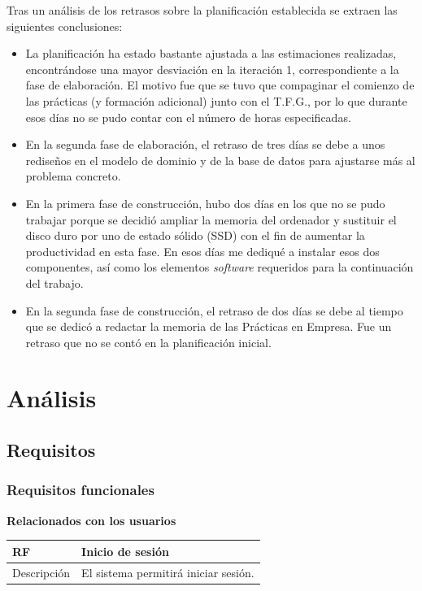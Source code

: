 \documentclass[twoside]{report}
\newcommand\addrow[2]{#1 &#2\\ }
\newcommand\addheading[2]{#1 &#2\\ \hline}
\newcommand\tabularhead{\begin{tabular}{lp{0.7\textwidth}}
\hline
}
\newenvironment{req}{\tabularhead}
{\hline\end{tabular}}
\begin{document}
Tras un análisis de los retrasos sobre la planificación establecida se extraen las siguientes conclusiones:
\begin{itemize}

\item La planificación ha estado bastante ajustada a las estimaciones realizadas, encontrándose una mayor desviación en la iteración 1, correspondiente a la fase de elaboración. El motivo fue que se tuvo que compaginar el comienzo de las prácticas (y formación adicional) junto con el T.F.G., por lo que durante esos días no se pudo contar con el número de horas especificadas.

\item En la segunda fase de elaboración, el retraso de tres días se debe a unos rediseños en el modelo de dominio y de la base de datos para ajustarse más al problema concreto.

\item En la primera fase de construcción, hubo dos días en los que no se pudo trabajar porque se decidió ampliar la memoria del ordenador y sustituir el disco duro por uno de estado sólido (SSD) con el fin de aumentar la productividad en esta fase. En esos días me dediqué a instalar esos dos componentes, así como los elementos \textit{software} requeridos para la continuación del trabajo.

\item En la segunda fase de construcción, el retraso de dos días se debe al tiempo que se dedicó a redactar la memoria de las Prácticas en Empresa. Fue un retraso que no se contó en la planificación inicial.

\end{itemize}


\section{Análisis}
\subsection{Requisitos}


\subsubsection{Requisitos funcionales}

\textbf{Relacionados con los usuarios}\\

\begin{req}
	\addheading{\textbf{RF\arabic{functionalRequirements}}}{Inicio de sesión}
	\addrow{Descripción}{El sistema permitirá iniciar sesión.}
\end{req} \\
\end{document}
